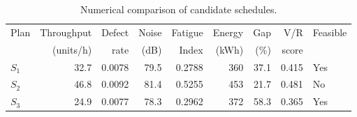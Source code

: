 \begin{table}[htbp]
\centering
\caption{Numerical comparison of candidate schedules.}
\label{tab:numerical-sim}
\small
\begin{tabular}{@{}lrrrrrrrl@{}}
\toprule
Plan & Throughput & Defect & Noise & Fatigue & Energy & Gap & V/R & Feasible \\
     & (units/h)  & rate   & (dB)  & Index   & (kWh)  & (\%) & score &         \\
\midrule
$S_{1}$ & 32.7 & 0.0078 & 79.5 & 0.2788 & 360 & 37.1 & 0.415 & Yes \\
$S_{2}$ & 46.8 & 0.0092 & 81.4 & 0.5255 & 453 & 21.7 & 0.481 & No \\
$S_{3}$ & 24.9 & 0.0077 & 78.3 & 0.2962 & 372 & 58.3 & 0.365 & Yes \\
\bottomrule
\end{tabular}
\end{table}
